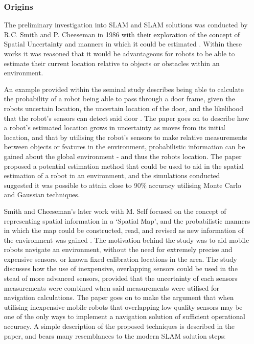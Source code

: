 \subsubsection{Origins}
The preliminary investigation into SLAM and SLAM solutions was conducted by
R.C. Smith and P. Cheeseman in 1986 with their exploration of the concept of
Spatial Uncertainty and manners in which it could be estimated
\cite{Smith1986,Smith1988}.
Within these works it was reasoned that it would be advantageous for robots to
be able to estimate their current location relative to objects or obstacles
within an environment.

An example provided within the seminal study describes being
able to calculate the probability of a robot being able to pass through a
door frame, given the robots uncertain location, the uncertain location of the
door, and the likelihood that the robot's sensors can detect said door
\cite{Smith1986}. 
The paper goes on to describe how a robot's estimated location grows in
uncertainty as moves from its initial location, and that by utilising the
robot's sensors to make relative measurements between objects or features in the
environment, probabilistic information can be gained about the global
environment - and thus the robots location.
The paper proposed a potential estimation method that could be used to aid
in the spatial estimation of a robot in an environment, and the simulations
conducted suggested it was possible to attain close to 90\% accuracy utilising
Monte Carlo and Gaussian techniques.

Smith and Cheeseman's later work with M. Self focused on the concept of
representing spatial information in a `Spatial Map', and the probabilistic
manners in which the map could be constructed, read, and revised as new
information of the environment was gained \cite{Smith1988}.
The motivation behind the study was to aid mobile robots navigate an
environment, without the need for extremely precise and expensive sensors, or
known fixed calibration locations in the area.
The study discusses how the use of inexpensive, overlapping sensors could be
used in the stead of more advanced sensors, provided that the uncertainty of
each sensors measurements were combined when said measurements were utilised
for navigation calculations.
The paper goes on to make the argument that when utilising inexpensive mobile
robots that overlapping low quality sensors may be one of the only ways to
implement a navigation solution of sufficient operational accuracy.
A simple description of the proposed techniques is described in the paper, and
bears many resemblances to the modern SLAM solution steps:

